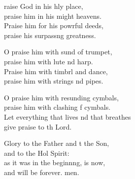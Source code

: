 \settowidth{\versewidth}{Let everything that lives and that breathes *}
\begin{psalmverse}%
  \begin{patverse}
raise God in his hly place,\Med\\
praise him in his might heavens.\\
Praise him for his powrful deeds,\Med\\
praise his surpass\pointup{\i}ng greatness.

O praise him with sund of trumpet,\Med\\
praise him with lute nd harp.\\
Praise him with timbrl and dance,\Med\\
praise him with strings nd pipes.

O praise him with resunding cymbals,\Med\\
praise him with clashing f cymbals.\\
Let everything that lives nd that breathes\Med\\
give praise to th Lord.

Glory to the Father and t the Son,\Med\\
and to the Hol Spirit:\\
as it was in the beginn\pointup{\i}ng, is now,\Med\\
and will be forever. men. 
  \end{patverse}
\end{psalmverse}
